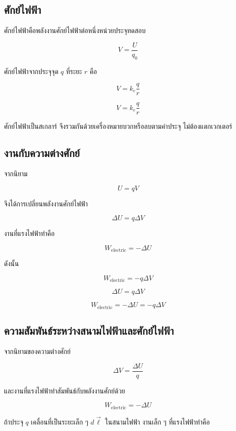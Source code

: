 \subsection{ศักย์ไฟฟ้า}

ศักย์ไฟฟ้าคือพลังงานศักย์ไฟฟ้าต่อหนึ่งหน่วยประจุทดสอบ

\[
V=\frac{U}{q_0}
\]

ศักย์ไฟฟ้าจากประจุจุด $q$ ที่ระยะ $r$ คือ

\[
V=k_e\frac{q}{r}
\]

\begin{tcolorbox}[title=ศักย์ไฟฟ้าจากประจุจุด]
\[
V=k_e\frac{q}{r}
\]

ศักย์ไฟฟ้าเป็นสเกลาร์ จึงรวมกันด้วยเครื่องหมายบวกหรือลบตามค่าประจุ ไม่ต้องแตกเวกเตอร์
\end{tcolorbox}

\subsection{งานกับความต่างศักย์}

จากนิยาม

\[
U=qV
\]

จึงได้การเปลี่ยนพลังงานศักย์ไฟฟ้า

\[
\Delta U=q\Delta V
\]

งานที่แรงไฟฟ้าทำคือ

\[
W_{\text{electric}}=-\Delta U
\]

ดังนั้น

\[
W_{\text{electric}}=-q\Delta V
\]

\begin{tcolorbox}[title=ความสัมพันธ์งานและศักย์ไฟฟ้า]
\[
\Delta U=q\Delta V
\]

\[
W_{\text{electric}}=-\Delta U=-q\Delta V
\]
\end{tcolorbox}

\subsection{ความสัมพันธ์ระหว่างสนามไฟฟ้าและศักย์ไฟฟ้า}

จากนิยามของความต่างศักย์

\[
\Delta V=\frac{\Delta U}{q}
\]

และงานที่แรงไฟฟ้าทำสัมพันธ์กับพลังงานศักย์ด้วย

\[
W_{\text{electric}}=-\Delta U
\]

ถ้าประจุ $q$ เคลื่อนที่เป็นระยะเล็ก ๆ $d\vec{\ell}$ ในสนามไฟฟ้า งานเล็ก ๆ ที่แรงไฟฟ้าทำคือ

